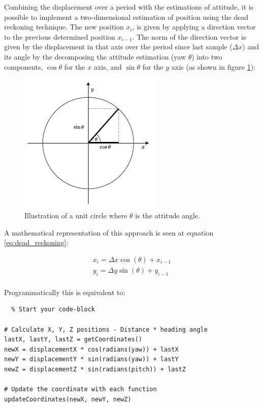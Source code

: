 Combining the displacement over a period with the estimations of attitude, it is possible to implement a two-dimensional estimation of position using the dead reckoning technique. The new position $x_i$, is given by applying a direction vector to the previous determined position $x_{i-1}$. The norm of the direction vector is given by the displacement in that axis over the period since last sample ($\Delta x$) and its angle by the decomposing the attitude estimation (yaw $\theta$) into two components, $\cos \theta$ for the $x$ axis, and $\sin \theta$ for the $y$ axis (as shown in figure \ref{fig:trignometric}):

\begin{figure}[!h]
    \centering
    \includegraphics[width=0.6\textwidth]{figures/trignometric.pdf}
    \caption{Illustration of a unit circle where $\theta$ is the attitude angle.}
    \label{fig:trignometric}
\end{figure}

A mathematical representation of this approach is seen at equation \ref{eq:dead_reckoning}:

\begin{equation}
    \begin{gathered}
        x_i = \Delta x \cos (\theta) + x_{i-1} \\
        y_i = \Delta y \sin (\theta) + y_{i-1} \\
    \end{gathered}
    \label{eq:dead_reckoning}
\end{equation}

Programmatically this is equivalent to:

\lstset{language=Python}
\begin{lstlisting}  % Start your code-block
    
# Calculate X, Y, Z positions - Distance * heading angle
lastX, lastY, lastZ = getCoordinates()
newX = displacementX * cos(radians(yaw)) + lastX
newY = displacementY * sin(radians(yaw)) + lastY
newZ = displacementZ * sin(radians(pitch)) + lastZ 

# Update the coordinate with each function
updateCoordinates(newX, newY, newZ)
    
\end{lstlisting}


